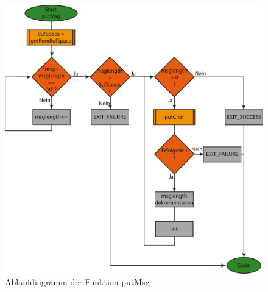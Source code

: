 \begin{figure}[h]
\includegraphics[scale = 0.8]{./putMsg.png}
\hspace{-14pt}
\caption{Ablaufdiagramm der Funktion putMsg}
\end{figure} 


